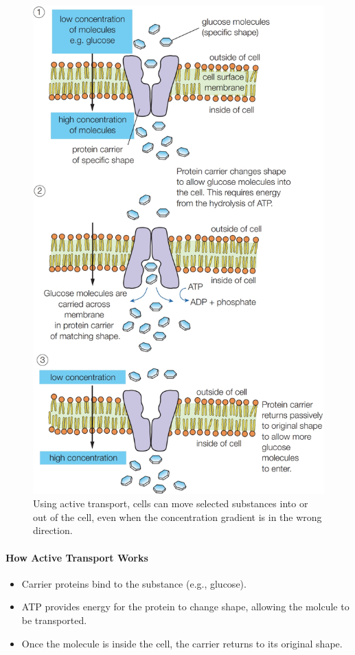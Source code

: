 \begin{figure}[H]
    \centering
    \includegraphics[scale=0.2]{Biology/2A/Images/2A-4-1.png}
    \caption{Using active transport, cells can move selected substances into or out of the cell, even when the concentration
    gradient is in the wrong direction.}
\end{figure}

\paragraph{How Active Transport Works}
\begin{itemize}
    \item Carrier proteins bind to the substance (e.g., glucose).
    \item ATP provides energy for the protein to change shape, allowing the molcule to be transported.
    \item Once the molecule is inside the cell, the carrier returns to its original shape.
\end{itemize}

